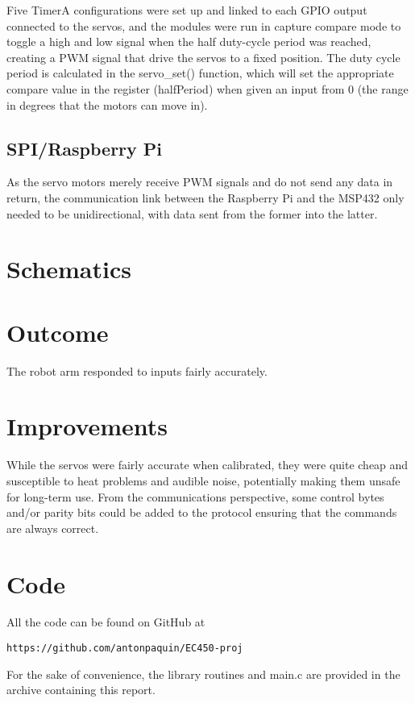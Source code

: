 \documentclass[10pt]{article}
\begin{document}
Five TimerA configurations were set up and linked to each GPIO output connected to the servos, and the modules were run in capture compare mode to toggle a high and low signal when the half duty-cycle period was reached, creating a PWM signal that drive the servos to a fixed position. The duty cycle period is calculated in the servo\_set() function, which will set the appropriate compare value in the register (halfPeriod) when given an input from 0 (the range in degrees that the motors can move in).

\subsection{SPI/Raspberry Pi}

As the servo motors merely receive PWM signals and do not send any data in return, the communication link between the Raspberry Pi and the MSP432 only needed to be unidirectional, with data sent from the former into the latter. 

\section{Schematics}

\section{Outcome}

The robot arm responded to inputs fairly accurately. 

\section{Improvements}
While the servos were fairly accurate when calibrated, they were quite cheap and susceptible to heat problems and audible noise, potentially making them unsafe for long-term use.
From the communications perspective, some control bytes and/or parity bits could be added to the protocol ensuring that the commands are always correct.
\section{Code}


All the code can be found on GitHub at 
\begin{lstlisting}
https://github.com/antonpaquin/EC450-proj
\end{lstlisting}
For the sake of convenience, the library routines and main.c are provided in the archive containing this report.
\end{document}
